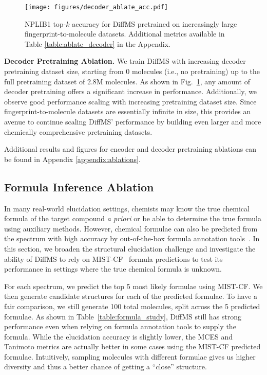 \documentclass{article}
\theoremstyle{plain}
\theoremstyle{definition}
\theoremstyle{remark}
\newcommand{\ours}{DiffMS\xspace}
\begin{document}
\begin{figure}
    \centering
        \vspace{-0.1in}
    \texttt{[image: figures/decoder\_ablate\_acc.pdf]}
    \vspace{-0.25in}
    \caption{NPLIB1 top-$k$ accuracy for \ours pretrained on increasingly large fingerprint-to-molecule datasets. Additional metrics available in Table \ref{table:ablate_decoder} in the Appendix.}
    \label{fig:ablate_decoder}
    \vspace{-0.1in}
\end{figure}

\textbf{Decoder Pretraining Ablation.} We train \ours with increasing decoder pretraining dataset size, starting from 0 molecules (i.e., no pretraining) up to the full pretraining dataset of 2.8M molecules. As shown in Fig.~\ref{fig:ablate_decoder}, any amount of decoder pretraining offers a significant increase in performance. Additionally, we observe good performance scaling with increasing pretraining dataset size. Since fingerprint-to-molecule datasets are essentially infinite in size, this provides an avenue to continue scaling \ours' performance by building even larger and more chemically comprehensive pretraining datasets.

Additional results and figures for encoder and decoder pretraining ablations can be found in Appendix \ref{appendix:ablations}.



\subsection{Formula Inference Ablation}
\label{sec:formula_ablation}

In many real-world elucidation settings, chemists may know the true chemical formula of the target compound \textit{a priori} or be able to determine the true formula using auxiliary methods. However, chemical formulae can also be predicted from the spectrum with high accuracy by out-of-the-box formula annotation tools~\citep{goldman2023mist-cf, Xing2023-buddy, bocker2016fragmentation}. In this section, we broaden the structural elucidation challenge and investigate the ability of DiffMS to rely on MIST-CF~\citep{goldman2023mist-cf} formula predictions to test its performance in settings where the true chemical formula is unknown.

For each spectrum, we predict the top 5 most likely formulae using MIST-CF. We then generate candidate structures for each of the predicted formulae. To have a fair comparison, we still generate 100 total molecules, split across the 5 predicted formulae. As shown in Table~\ref{table:formula_study}, DiffMS still has strong performance even when relying on formula annotation tools to supply the formula. While the elucidation accuracy is slightly lower, the MCES and Tanimoto metrics are actually better in some cases using the MIST-CF predicted formulae. Intuitively, sampling molecules with different formulae gives us higher diversity and thus a better chance of getting a ``close'' structure.  
\end{document}
